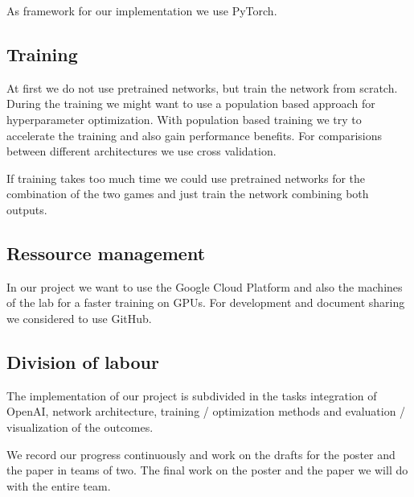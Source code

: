 \documentclass[10pt,twocolumn,letterpaper]{article}
\begin{document}
As framework for our implementation we use PyTorch.

\subsection{Training}
At first we do not use pretrained networks, but train the network from scratch. During the training we might want to use a population based approach \cite{Jaderberg2017} for hyperparameter optimization. With population based training we try to accelerate the training and also gain performance benefits. For comparisions between different architectures we use cross validation.

If training takes too much time we could use pretrained networks for the combination of the two games and just train the network combining both outputs.

\subsection{Ressource management}
In our project we want to use the Google Cloud Platform and also the machines of the lab for a faster training on GPUs. For development and document sharing we considered to use GitHub.



%

\subsection{Division of labour}
The implementation of our project is subdivided in the tasks integration of OpenAI, network architecture, training / optimization methods and evaluation / visualization of the outcomes. 

We record our progress continuously and work on the drafts for the poster and the paper in teams of two. The final work on the poster and the paper we will do with the entire team.
\end{document}
